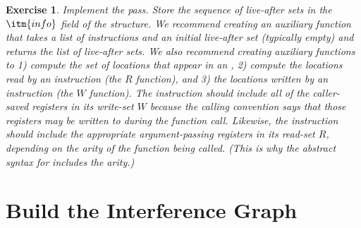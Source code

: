 \documentclass[11pt]{book}
\newtheorem{exercise}[theorem]{Exercise}
\begin{document}
\begin{exercise}\normalfont
Implement the  pass. Store the sequence of
live-after sets in the $\itm{info}$ field of the 
structure.
%
We recommend creating an auxiliary function that takes a list of
instructions and an initial live-after set (typically empty) and
returns the list of live-after sets.
%
We also recommend creating auxiliary functions to 1) compute the set
of locations that appear in an \Arg{}, 2) compute the locations read
by an instruction (the $R$ function), and 3) the locations written by
an instruction (the $W$ function). The  instruction should
include all of the caller-saved registers in its write-set $W$ because
the calling convention says that those registers may be written to
during the function call. Likewise, the  instruction
should include the appropriate argument-passing registers in its
read-set $R$, depending on the arity of the function being
called. (This is why the abstract syntax for  includes the
arity.)
\end{exercise}

\clearpage

\section{Build the Interference Graph}
\label{sec:build-interference}
\end{document}
